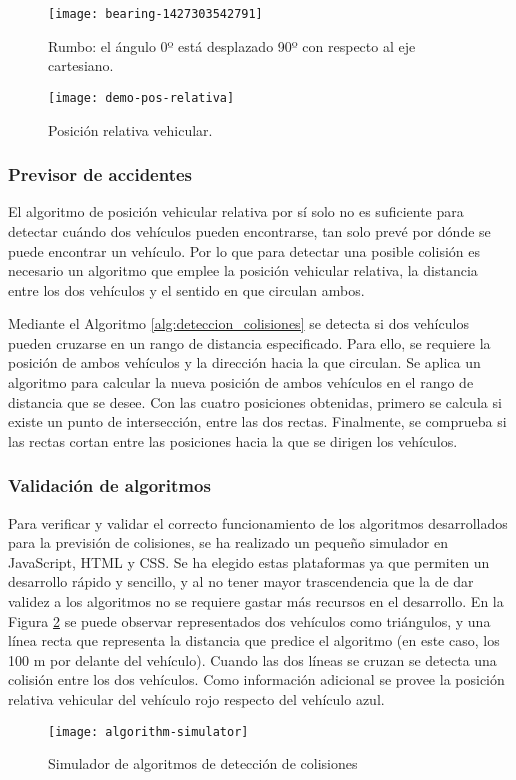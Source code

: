 \begin{figure}[h]
	\begin{center}
		\texttt{[image: bearing-1427303542791]}
		\caption{Rumbo: el ángulo 0º está desplazado 90º con respecto al eje cartesiano.}
		\label{fig:rumbo_gps}
	\end{center}
	\begin{center}
		\texttt{[image: demo-pos-relativa]}
		\caption{Posición relativa vehicular.}
		\label{fig:demo_pos_relativa}
	\end{center}
\end{figure}

\FloatBarrier
\subsubsection{Previsor de accidentes}
El algoritmo de posición vehicular relativa por sí solo no es suficiente para
detectar cuándo dos vehículos pueden encontrarse, tan solo prevé por dónde se
puede encontrar un vehículo. Por lo que para detectar una posible colisión es
necesario un algoritmo que emplee la posición vehicular relativa, la distancia
entre los dos vehículos y el sentido en que circulan ambos.

Mediante el Algoritmo \ref{alg:deteccion_colisiones} se detecta si dos
vehículos pueden cruzarse en un rango de distancia especificado. Para ello,
se requiere la posición de ambos vehículos y la dirección hacia la que
circulan. Se aplica un algoritmo para calcular la nueva posición de ambos
vehículos en el rango de distancia que se desee. Con las cuatro posiciones
obtenidas, primero se calcula si existe un punto de intersección, entre las
dos rectas. Finalmente, se comprueba si las rectas cortan entre las posiciones
hacia la que se dirigen los vehículos.

\subsubsection{Validación de algoritmos}
Para verificar y validar el correcto funcionamiento de los algoritmos
desarrollados para la previsión de colisiones, se ha realizado un pequeño
simulador en JavaScript, HTML y CSS. Se ha elegido estas plataformas ya que
permiten un desarrollo rápido y sencillo, y al no tener mayor trascendencia que
la de dar validez a los algoritmos no se requiere gastar más recursos en el
desarrollo. En la Figura \ref{fig:simulador-algoritmos} se puede observar
representados dos vehículos como triángulos, y una línea recta que representa
la distancia que predice el algoritmo (en este caso, los 100 m por delante
del vehículo). Cuando las dos líneas se cruzan se detecta una colisión entre
los dos vehículos. Como información adicional se provee la posición relativa
vehicular del vehículo rojo respecto del vehículo azul.

\begin{figure}[h]
	\begin{center}
		\texttt{[image: algorithm-simulator]}
		\caption{Simulador de algoritmos de detección de colisiones}
		\label{fig:simulador-algoritmos}
	\end{center}
\end{figure}
